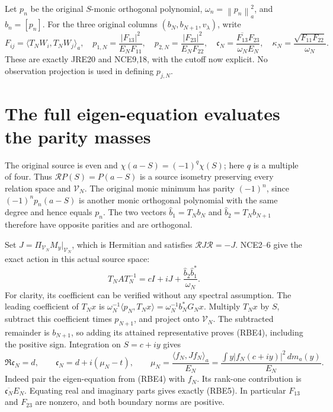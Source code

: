 \documentclass[11pt]{article}
\newcommand{\norm}[1]{\left\lVert#1\right\rVert}
\begin{document}
Let \(p_n\) be the original \(S\)-monic orthogonal polynomial,
\(\omega_n=\norm{p_n}_a^2\), and \(b_n=[p_n]\).
For the three original columns \((b_N,b_{N+1},v_\lambda)\), write
\begin{equation}\tag{RBE3}
 F_{ij}=\langle T_NW_i,T_NW_j\rangle_a,\quad
 p_{1,N}=\frac{|F_{13}|^2}{E_NF_{11}},\quad
 p_{2,N}=\frac{|F_{23}|^2}{E_NF_{22}},\quad
 \mathfrak c_N=\frac{\overline{F_{13}}F_{23}}{\omega_NE_N},\quad
 \kappa_N=\frac{\sqrt{F_{11}F_{22}}}{\omega_N}.
\end{equation}
These are exactly JRE20 and NCE9,18, with the cutoff now explicit.
No observation projection is used in defining \(p_{j,N}\).

\section{The full eigen-equation evaluates the parity masses}

The original source is even and
\(\chi(a-S)=(-1)^q\chi(S)\); here \(q\) is a multiple of
four. Thus \(\mathcal R P(S)=P(a-S)\) is a source isometry
preserving every relation space and \(\mathcal V_N\).
The original monic minimum has parity \((-1)^n\), since
\((-1)^np_n(a-S)\) is another monic orthogonal polynomial
with the same degree and hence equals \(p_n\). The two vectors
\(\widehat b_1=T_Nb_N\) and \(\widehat b_2=T_Nb_{N+1}\)
therefore have opposite parities and are orthogonal.

Set \(J=\Pi_{\mathcal V_N}M_y|_{\mathcal V_N}\), which is
Hermitian and satisfies \(\mathcal RJ\mathcal R=-J\).
NCE2--6 give the exact action in this actual source space:
\begin{equation}\tag{RBE4}
 T_NAT_N^{-1}=cI+iJ+
             \frac{\widehat b_2\widehat b_1^*}{\omega_N}.
\end{equation}
For clarity, its coefficient can be verified without any spectral
assumption. The leading coefficient of \(T_Nx\) is
\(\omega_N^{-1}\langle p_N,T_Nx\rangle
=\omega_N^{-1}b_N^*G_Nx\). Multiply \(T_Nx\) by \(S\),
subtract this coefficient times \(p_{N+1}\), and project onto
\(\mathcal V_N\). The subtracted remainder is \(b_{N+1}\),
so adding its attained representative proves (RBE4), including
the positive sign. Integration on \(S=c+iy\) gives
\begin{equation}\tag{RBE5}
 \Re\mathfrak c_N=d,\qquad
 \mathfrak c_N=d+i(\mu_N-t),\qquad
 \mu_N=\frac{\langle f_N,Jf_N\rangle_a}{E_N}
       =\frac{\int y|f_N(c+iy)|^2\,dm_a(y)}{E_N}.
\end{equation}
Indeed pair the eigen-equation from (RBE4) with \(f_N\).
Its rank-one contribution is \(\overline{\mathfrak c_N}E_N\).
Equating real and imaginary parts gives exactly (RBE5).
In particular \(F_{13}\) and \(F_{23}\) are nonzero, and
both boundary norms are positive.
\end{document}
